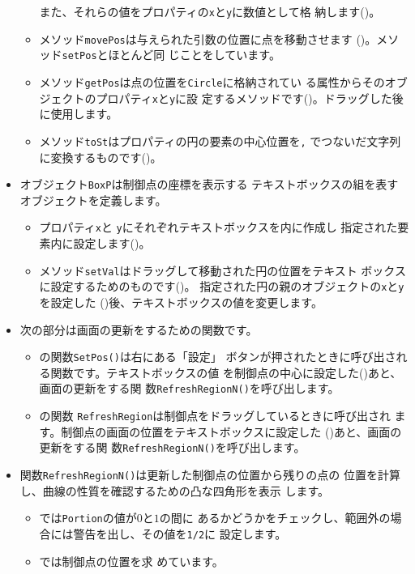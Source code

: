 \begin{itemize}
\begin{itemize}
       また、それらの値をプロパティの\texttt{x}と\texttt{y}に数値として格
       納します()。
 \item メソッド\texttt{movePos}は与えられた引数の位置に点を移動させます
       ()。メソッド\texttt{setPos}とほとんど同
       じことをしています。
 \item メソッド\texttt{getPos}は点の位置を\texttt{Circle}に格納されてい
       る属性からそのオブジェクトのプロパティ\texttt{x}と\texttt{y}に設
       定するメソッドです()。ドラッグした後に使用します。
 \item メソッド\texttt{toSt}はプロパティの円の要素の中心位置を\texttt{,}
       でつないだ文字列に変換するものです()。
\end{itemize}
 \item オブジェクト\texttt{BoxP}は制御点の座標を表示する
       テキストボックスの組を表すオブジェクトを定義します。
\begin{itemize}
 \item プロパティ\texttt{x}と
       \texttt{y}にそれぞれテキストボックスを内に作成し
       指定された要素内に設定します()。
 \item メソッド\texttt{setVal}はドラッグして移動された円の位置をテキスト
       ボックスに設定するためのものです()。
       指定された円の親のオブジェクトの\texttt{x}と\texttt{y}を設定した
       ()後、テキストボックスの値を変更します。 
\end{itemize}
 \item 次の部分は画面の更新をするための関数です。
\begin{itemize}
 \item {}の関数\texttt{SetPos()}は右にある「設定」
       ボタンが押されたときに呼び出される関数です。テキストボックスの値
       を制御点の中心に設定した()あと、画面の更新をする関
       数\texttt{RefreshRegionN()}を呼び出します。
 \item {}の関数
       \texttt{RefreshRegion}は制御点をドラッグしているときに呼び出され
       ます。制御点の画面の位置をテキストボックスに設定した
       ()あと、画面の更新をする関
       数\texttt{RefreshRegionN()}を呼び出します。
\end{itemize}
 \item 関数\texttt{RefreshRegionN()}は更新した制御点の位置から残りの点の
       位置を計算し、\Bezier 曲線の性質を確認するための凸な四角形を表示
       します。
\begin{itemize}
 \item {}では\texttt{Portion}の値が$0$と$1$の間に
       あるかどうかをチェックし、範囲外の場合には警告を出し、その値を\texttt{1/2}に
       設定します。
 \item {}では制御点の位置を求
       めています。


\end{itemize}
\end{itemize}
